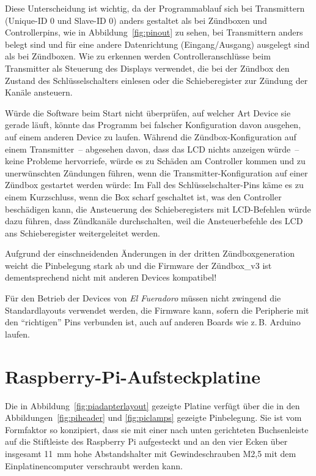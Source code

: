 \documentclass[paper=a4, parskip, numbers=noenddot, toc=listof, headsepline]{scrbook}
\newcommand{\anlage}{\emph{El Fueradoro}}
\begin{document}
			Diese Unterscheidung ist wichtig, da der Programmablauf sich bei Transmittern (Unique-ID 0 und Slave-ID 0) anders gestaltet als bei Zündboxen und Controllerpins, wie in Abbildung~\ref{fig:pinout} zu sehen, bei Transmittern anders belegt sind und für eine andere Datenrichtung (Eingang/Ausgang) ausgelegt sind als bei Zündboxen.  Wie zu erkennen werden Controlleranschlüsse beim Transmitter als Steuerung des Displays verwendet, die bei der Zündbox den Zustand des Schlüsselschalters einlesen oder die Schieberegister zur Zündung der Kanäle ansteuern.

			Würde die Software beim Start nicht überprüfen, auf welcher Art Device sie gerade läuft, könnte das Programm bei falscher Konfiguration davon ausgehen, auf einem anderen Device zu laufen. Während die Zündbox-Konfiguration auf einem Transmitter~-- abgesehen davon, dass das LCD nichts anzeigen würde~-- keine Probleme hervorriefe, würde es zu Schäden am Controller kommen und zu unerwünschten Zündungen führen, wenn die Transmitter-Konfiguration auf einer Zündbox gestartet werden würde: Im Fall des Schlüsselschalter-Pins käme es  zu einem Kurzschluss, wenn die Box scharf geschaltet ist, was den Controller beschädigen kann, die Ansteuerung des Schieberegisters mit LCD-Befehlen würde dazu führen, dass Zündkanäle durchschalten, weil die Ansteuerbefehle des LCD ans Schieberegister weitergeleitet werden.

			Aufgrund der einschneidenden Änderungen in der dritten Zündboxgeneration weicht die Pinbelegung stark ab und die Firmware der Zündbox\_v3 ist dementsprechend nicht mit anderen Devices kompatibel!

			Für den Betrieb der Devices von {\anlage} müssen nicht zwingend die Standardlayouts verwendet werden, die Firmware kann, sofern die Peripherie mit den \enquote{richtigen} Pins verbunden ist, auch auf anderen Boards wie z.\,B. Arduino laufen.

		\section{Raspberry-Pi-Aufsteckplatine}

			Die in Abbildung~\ref{fig:piadapterlayout} gezeigte Platine verfügt über die in den Abbildungen~\ref{fig:piheader} und \ref{fig:piclamps} gezeigte Pinbelegung. Sie ist vom Formfaktor so konzipiert, dass sie mit einer nach unten gerichteten Buchsenleiste auf die Stiftleiste des Raspberry Pi aufgesteckt und an den vier Ecken über insgesamt \SI{11}{\milli\metre} hohe Abstandshalter mit Gewindeschrauben M2,5 mit dem Einplatinencomputer verschraubt werden kann.
\end{document}

